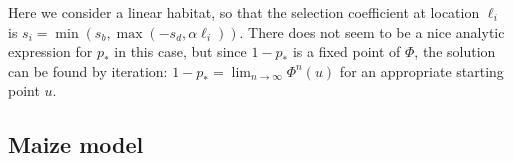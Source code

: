 
Here we consider a linear habitat, so that the selection coefficient at location $\ell_i$ is $s_i = \min( s_b, \max( - s_d, \alpha \ell_i ) )$.
There does not seem to be a nice analytic expression for $p_*$ in this case,
but since $1-p_*$ is a fixed point of $\Phi$, the solution can be found by iteration:
$1-p_* = \lim_{n \to \infty} \Phi^n(u)$ for an appropriate starting point $u$.

\subsection*{Maize model}

